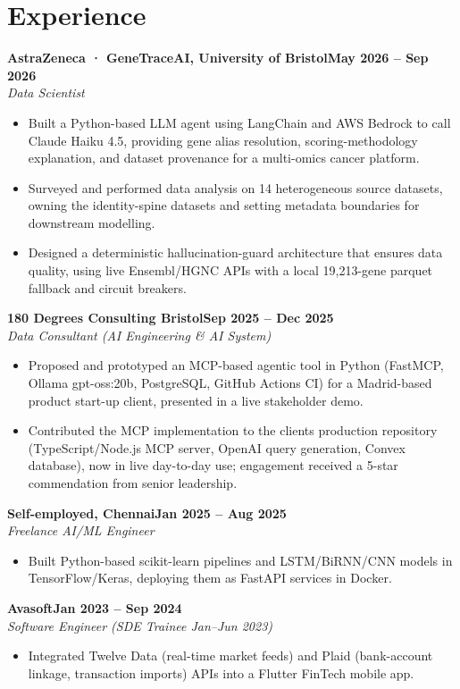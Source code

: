 \documentclass[a4paper,10pt]{article}
\newcommand{\entry}[4]{\noindent\textbf{#1}\hfill\textbf{#2}\\ \textit{#3}\hfill\textit{#4}\par}
\begin{document}
\section{Experience}
\entry{AstraZeneca · GeneTraceAI, University of Bristol}{May 2026 – Sep 2026}{Data Scientist}{}
\begin{itemize}
  \item Built a Python-based LLM agent using LangChain and AWS Bedrock to call Claude Haiku 4.5, providing gene alias resolution, scoring-methodology explanation, and dataset provenance for a multi-omics cancer platform.
  \item Surveyed and performed data analysis on 14 heterogeneous source datasets, owning the identity-spine datasets and setting metadata boundaries for downstream modelling.
  \item Designed a deterministic hallucination-guard architecture that ensures data quality, using live Ensembl/HGNC APIs with a local 19,213-gene parquet fallback and circuit breakers.
\end{itemize}
\vspace{3pt}
\entry{180 Degrees Consulting Bristol}{Sep 2025 – Dec 2025}{Data Consultant (AI Engineering \& AI System)}{}
\begin{itemize}
  \item Proposed and prototyped an MCP-based agentic tool in Python (FastMCP, Ollama gpt-oss:20b, PostgreSQL, GitHub Actions CI) for a Madrid-based product start-up client, presented in a live stakeholder demo.
  \item Contributed the MCP implementation to the client\textquotesingle{}s production repository (TypeScript/Node.js MCP server, OpenAI query generation, Convex database), now in live day-to-day use; engagement received a 5-star commendation from senior leadership.
\end{itemize}
\vspace{3pt}
\entry{Self-employed, Chennai}{Jan 2025 – Aug 2025}{Freelance AI/ML Engineer}{}
\begin{itemize}
  \item Built Python-based scikit-learn pipelines and LSTM/BiRNN/CNN models in TensorFlow/Keras, deploying them as FastAPI services in Docker.
\end{itemize}
\vspace{3pt}
\entry{Avasoft}{Jan 2023 – Sep 2024}{Software Engineer (SDE Trainee Jan–Jun 2023)}{}
\begin{itemize}
  \item Integrated Twelve Data (real-time market feeds) and Plaid (bank-account linkage, transaction imports) APIs into a Flutter FinTech mobile app.
\end{itemize}
\end{document}
